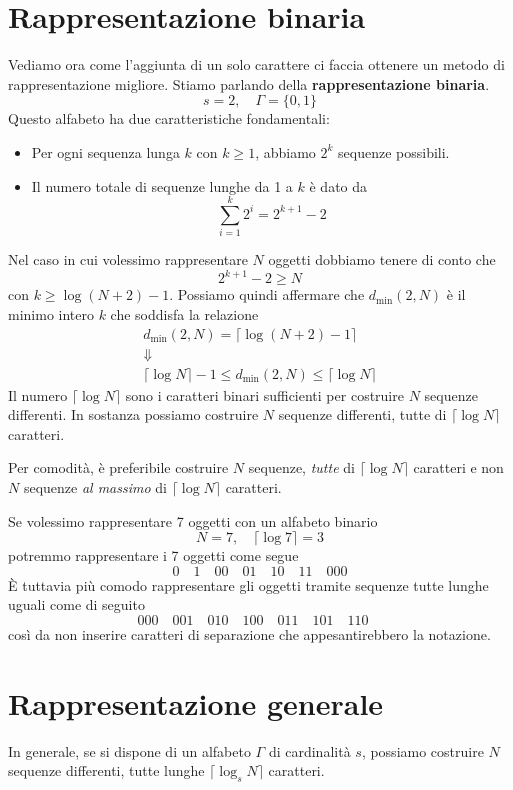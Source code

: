 \section{Rappresentazione binaria}\label{rappresentazione_binaria}
Vediamo ora come l'aggiunta di un solo carattere ci faccia ottenere un metodo di rappresentazione migliore. Stiamo
parlando della \textbf{rappresentazione binaria}.
\[ s = 2, \quad \Gamma = \{ 0, 1 \} \]
Questo alfabeto ha due caratteristiche fondamentali:
\begin{itemize}
	\item Per ogni sequenza lunga $k$ con $k \geq 1$, abbiamo $2^k$ sequenze possibili.
	\item Il numero totale di sequenze lunghe da 1 a $k$ \`e dato da
	      \[ \sum_{i = 1}^k 2^i = 2^{k + 1} - 2 \]
\end{itemize}
Nel caso in cui volessimo rappresentare $N$ oggetti dobbiamo tenere di conto che
\[ 2^{k + 1} - 2 \geq N \]
con $k \geq \log (N + 2) - 1$. Possiamo quindi affermare che $d_{\min}(2, N)$ \`e il minimo intero $k$ che soddisfa
la relazione
\begin{gather*}
	d_{\min}(2, N) = \lceil \log (N + 2) - 1 \rceil \\
	\Downarrow \\
	\lceil \log N \rceil - 1 \leq d_{\min}(2, N) \leq \lceil \log N \rceil
\end{gather*}
Il numero $\lceil \log N \rceil$ sono i caratteri binari sufficienti per costruire $N$ sequenze differenti. In
sostanza possiamo costruire $N$ sequenze differenti, tutte di $\lceil \log N \rceil$ caratteri.

Per comodit\`a, \`e preferibile costruire $N$ sequenze, \emph{tutte} di $\lceil \log N \rceil$ caratteri e non $N$
sequenze \emph{al massimo} di $\lceil \log N \rceil$ caratteri.

\begin{example}
	Se volessimo rappresentare 7 oggetti con un alfabeto binario
	\[ N = 7, \quad \lceil \log 7 \rceil = 3 \]
	potremmo rappresentare i 7 oggetti come segue
	\[
		0 \quad
		1 \quad
		00 \quad
		01 \quad
		10 \quad
		11 \quad
		000
	\]
	\`E tuttavia pi\`u comodo rappresentare gli oggetti tramite sequenze tutte lunghe uguali come di seguito
	\[
		000 \quad
		001 \quad
		010 \quad
		100 \quad
		011 \quad
		101 \quad
		110 \quad
	\]
	cos\`i da non inserire caratteri di separazione che appesantirebbero la notazione.
\end{example}

\section{Rappresentazione generale}\label{rappresentazione_generale}
In generale, se si dispone di un alfabeto $\Gamma$ di cardinalit\`a $s$, possiamo costruire $N$ sequenze differenti,
tutte lunghe $\lceil \log_s N \rceil$ caratteri.

